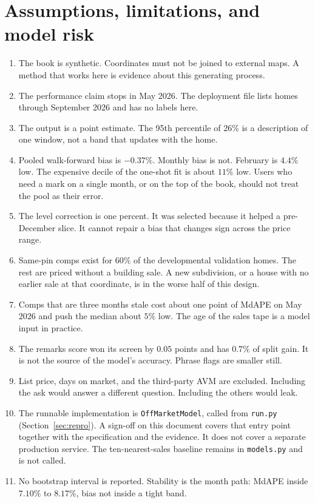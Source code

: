 \documentclass[11pt]{article}
\begin{document}
\section{Assumptions, limitations, and model risk}
\label{sec:limits}

\begin{enumerate}
\item The book is synthetic. Coordinates must not be joined to external maps. A method that works here is evidence about this generating process.

\item The performance claim stops in May 2026. The deployment file lists homes through September 2026 and has no labels here.

\item The output is a point estimate. The 95th percentile of \(26\%\) is a description of one window, not a band that updates with the home.

\item Pooled walk-forward bias is \(-0.37\%\). Monthly bias is not. February is \(4.4\%\) low. The expensive decile of the one-shot fit is about \(11\%\) low. Users who need a mark on a single month, or on the top of the book, should not treat the pool as their error.

\item The level correction is one percent. It was selected because it helped a pre-December slice. It cannot repair a bias that changes sign across the price range.

\item Same-pin comps exist for \(60\%\) of the developmental validation homes. The rest are priced without a building sale. A new subdivision, or a house with no earlier sale at that coordinate, is in the worse half of this design.

\item Comps that are three months stale cost about one point of MdAPE on May 2026 and push the median about \(5\%\) low. The age of the sales tape is a model input in practice.

\item The remarks score won its screen by \(0.05\) points and has \(0.7\%\) of split gain. It is not the source of the model's accuracy. Phrase flags are smaller still.

\item List price, days on market, and the third-party AVM are excluded. Including the ask would answer a different question. Including the others would leak.

\item The runnable implementation is \texttt{OffMarketModel}, called from \texttt{run.py} (Section~\ref{sec:repro}). A sign-off on this document covers that entry point together with the specification and the evidence. It does not cover a separate production service. The ten-nearest-sales baseline remains in \texttt{models.py} and is not called.

\item No bootstrap interval is reported. Stability is the month path: MdAPE inside \(7.10\%\) to \(8.17\%\), bias not inside a tight band.
\end{enumerate}
\end{document}
